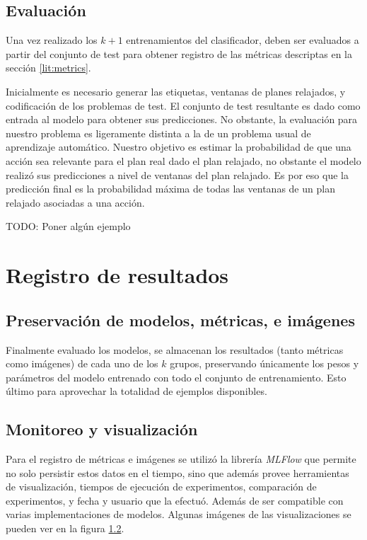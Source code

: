 \subsection{Evaluación}

Una vez realizado los $k + 1$ entrenamientos del clasificador, deben ser
evaluados a partir del conjunto de test para obtener registro de las métricas
descriptas en la sección \ref{lit:metrics}. 

Inicialmente es necesario generar las etiquetas, ventanas de planes relajados, y
codificación de los problemas de test. El conjunto de test resultante es dado
como entrada al modelo para obtener sus predicciones. No obstante, la evaluación
para nuestro problema es ligeramente distinta a la de un problema usual de
aprendizaje automático. Nuestro objetivo es estimar la probabilidad de que una
acción sea relevante para el plan real dado el plan relajado, no obstante el
modelo realizó sus predicciones a nivel de ventanas del plan relajado. Es por
eso que la predicción final es la probabilidad máxima de todas las ventanas de
un plan relajado asociadas a una acción.

TODO: Poner algún ejemplo

\section{Registro de resultados}

\subsection{Preservación de modelos, métricas, e imágenes}

Finalmente evaluado los modelos, se almacenan los resultados (tanto métricas
como imágenes) de cada uno de los $k$ grupos, preservando únicamente los pesos y
parámetros del modelo entrenado con todo el conjunto de entrenamiento. Esto
último para aprovechar la totalidad de ejemplos disponibles.

\subsection{Monitoreo y visualización}

Para el registro de métricas e imágenes se utilizó la librería \emph{MLFlow}
\cite{} que permite no solo persistir estos datos en el tiempo, sino que además
provee herramientas de visualización, tiempos de ejecución de experimentos,
comparación de experimentos, y fecha y usuario que la efectuó. Además de ser
compatible con varias implementaciones de modelos. Algunas imágenes de las
visualizaciones se pueden ver en la figura \ref{}.

